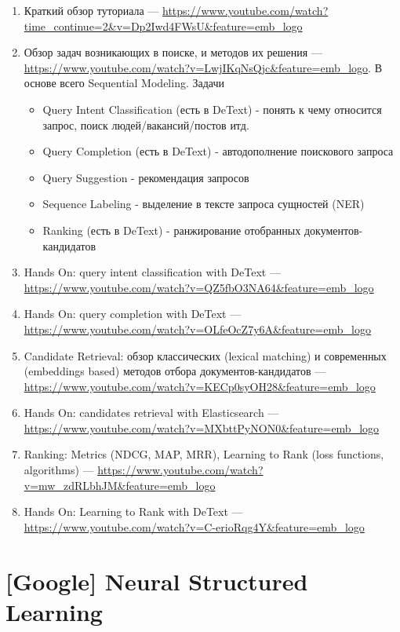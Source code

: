 \begin{enumerate}
    \item Краткий обзор туториала --- \url{https://www.youtube.com/watch?time_continue=2&v=Dp2Iwd4FWsU&feature=emb_logo}
    \item Обзор задач возникающих в поиске, и методов их решения --- \url{https://www.youtube.com/watch?v=LwjIKqNsQjc&feature=emb_logo}. В основе всего Sequential Modeling. 
    Задачи
        \begin{itemize}
            \item Query Intent Classification (есть в DeText) - понять к чему относится запрос, поиск людей/вакансий/постов итд.
            \item Query Completion (есть в DeText) - автодополнение поискового запроса
            \item Query Suggestion - рекомендация запросов
            \item Sequence Labeling - выделение в тексте запроса сущностей (NER)
            \item Ranking (есть в DeText) - ранжирование отобранных документов-кандидатов
        \end{itemize}
    \item Hands On: query intent classification with DeText --- \url{https://www.youtube.com/watch?v=QZ5fbO3NA64&feature=emb_logo}
    \item Hands On: query completion with DeText --- \url{https://www.youtube.com/watch?v=OLfeOcZ7y6A&feature=emb_logo}
    \item Candidate Retrieval: обзор классических (lexical matching) и современных (embeddings based) методов отбора документов-кандидатов --- \url{https://www.youtube.com/watch?v=KECp0syOH28&feature=emb_logo}
    \item Hands On: candidates retrieval with Elasticsearch --- \url{https://www.youtube.com/watch?v=MXbttPyNON0&feature=emb_logo}
    \item Ranking: Metrics (NDCG, MAP, MRR), Learning to Rank (loss functions, algorithms) --- \url{https://www.youtube.com/watch?v=mw_zdRLbhJM&feature=emb_logo}
    \item Hands On: Learning to Rank with DeText --- \url{https://www.youtube.com/watch?v=C-erioRqg4Y&feature=emb_logo}
\end{enumerate}

\section*{[Google] Neural Structured Learning} 

